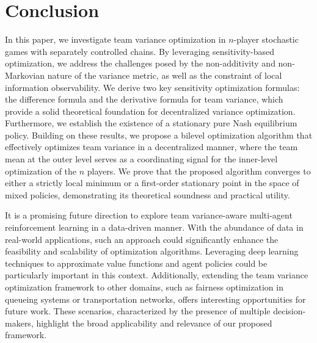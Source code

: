 \documentclass[12pt]{article}
\begin{document}
\section{Conclusion} \label{section_conclusion}
In this paper, we investigate team variance optimization in
$n$-player stochastic games with separately controlled chains. By
leveraging sensitivity-based optimization, we address the challenges
posed by the non-additivity and non-Markovian nature of the variance
metric, as well as the constraint of local information
observability. We derive two key sensitivity optimization formulas:
the difference formula and the derivative formula for team variance,
which provide a solid theoretical foundation for decentralized
variance optimization. Furthermore, we establish the existence of a
stationary pure Nash equilibrium policy. Building on these results,
we propose a bilevel optimization algorithm that effectively
optimizes team variance in a decentralized manner, where the team
mean at the outer level serves as a coordinating signal for the
inner-level optimization of the $n$ players. We prove that the
proposed algorithm converges to either a strictly local minimum or a
first-order stationary point in the space of mixed policies,
demonstrating its theoretical soundness and practical utility.


It is a promising future direction to explore team variance-aware
multi-agent reinforcement learning in a data-driven manner. With the
abundance of data in real-world applications, such an approach could
significantly enhance the feasibility and scalability of
optimization algorithms. Leveraging deep learning techniques to
approximate value functions and agent policies could be particularly
important in this context. Additionally, extending the team variance
optimization framework to other domains, such as fairness
optimization in queueing systems or transportation networks, offers
interesting opportunities for future work. These scenarios,
characterized by the presence of multiple decision-makers, highlight
the broad applicability and relevance of our proposed framework.
\end{document}
